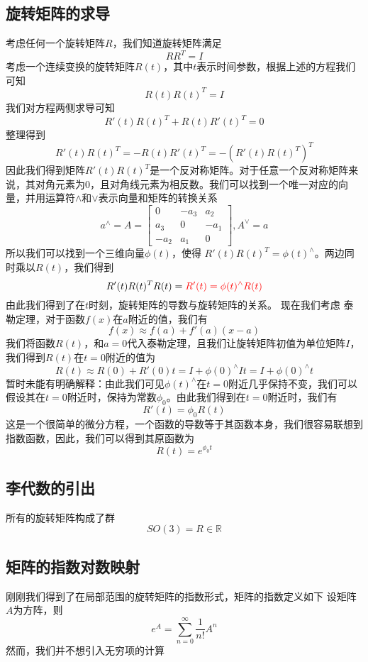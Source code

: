 \subsection{旋转矩阵的求导}
考虑任何一个旋转矩阵\(R\)，我们知道旋转矩阵满足
\[
    RR^T = I
\]
考虑一个连续变换的旋转矩阵\(R(t)\)，其中\(t\)表示时间参数，根据上述的方程我们可知
\[
    R(t)R(t)^T = I
\]
我们对方程两侧求导可知
\[
    R'(t)R(t)^T + R(t)R'(t)^T=0
\]
整理得到
\[
    R'(t)R(t)^T = -R(t)R'(t)^T = -(R'(t)R(t)^T)^T
\]
因此我们得到矩阵\(R'(t)R(t)^T\)是一个反对称矩阵。对于任意一个反对称矩阵来说，其对角元素为\(0\)，且对角线元素为相反数。我们可以找到一个唯一对应的向量，并用运算符\(\wedge\)和\(\vee\)表示向量和矩阵的转换关系
\[
    a^\wedge = A = \begin{bmatrix}0 & -a_3 & a_2\\a_3 & 0 & -a_1\\-a_2 & a_1 & 0\end{bmatrix}, A^\vee = a
\]
所以我们可以找到一个三维向量\(\phi(t)\)，使得{\color{red} \(R'(t)R(t)^T=\phi(t)^\wedge\)}。两边同时乘以\(R(t)\)，我们得到
\[
    R'(t)R(t)^TR(t) = {\color{red} R'(t) = \phi(t)^\wedge R(t)}
\]
由此我们得到了在\(t\)时刻，旋转矩阵的导数与旋转矩阵的关系。
现在我们考虑{\color{blue} 泰勒定理}，对于函数\(f(x)\)在\(a\)附近的值，我们有
\[
    f(x) \approx f(a) + f'(a)(x-a)
\]
我们将函数\(R(t)\)，和\(a=0\)代入泰勒定理，且我们让旋转矩阵初值为单位矩阵\(I\)，我们得到\(R(t)\)在\(t=0\)附近的值为
\[
    R(t) \approx R(0) + R'(0)t = I + \phi(0)^\wedge I t = I + \phi(0)^\wedge t
\]
{\color{red} 暂时未能有明确解释：由此我们可见\(\phi(t)^\wedge\)在\(t=0\)附近几乎保持不变，我们可以假设其在\(t=0\)附近时，保持为常数\(\phi_0\)。由此我们得到在\(t=0\)附近时，我们有}
\[
    R'(t) = \phi_0 R(t)
\]
这是一个很简单的微分方程，一个函数的导数等于其函数本身，我们很容易联想到指数函数，因此，我们可以得到其原函数为
\[
    R(t) = e^{\phi_0 t}
\]


\subsection{李代数的引出}
所有的旋转矩阵构成了群
\[
    SO(3) = {R \in 	\mathbb{R}}
\]


\subsection{矩阵的指数对数映射}
刚刚我们得到了在局部范围的旋转矩阵的指数形式，矩阵的指数定义如下
设矩阵\(A\)为方阵，则
\[
    e^A = \sum_{n=0}^{\infty}\frac{1}{n!}A^n
\]
然而，我们并不想引入无穷项的计算